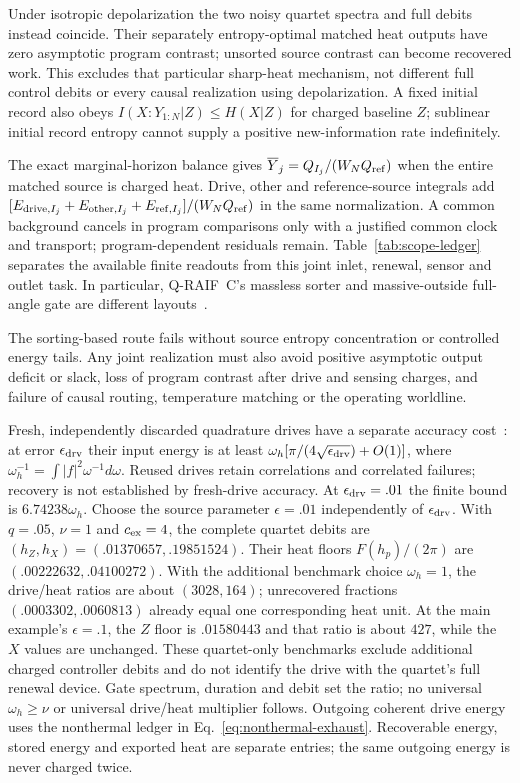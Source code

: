 Under isotropic depolarization the two noisy quartet spectra and full
debits instead coincide. Their separately entropy-optimal matched heat
outputs have zero asymptotic program contrast; unsorted source contrast
can become recovered work. This excludes that particular sharp-heat
mechanism, not different full control debits or every causal realization
using depolarization. A fixed initial record also obeys
$I(X:Y_{1:N}|Z)\le H(X|Z)$ for charged baseline $Z$; sublinear initial
record entropy cannot supply a positive new-information rate indefinitely.

The exact marginal-horizon balance gives
$\overline Y_j=Q_{I_j}/(W_NQ_{\rm ref})$ when the entire matched
source is charged heat. Drive, other and reference-source integrals
add $[E_{{\rm drive},I_j}+E_{{\rm other},I_j}
+E_{{\rm ref},I_j}]/(W_NQ_{\rm ref})$ in the same normalization. A common background cancels in
program comparisons only with a justified common clock and transport;
program-dependent residuals remain. Table~\ref{tab:scope-ledger} separates the available finite readouts
from this joint inlet, renewal, sensor and outlet task. In particular,
Q-RAIF~C's massless sorter and massive-outside full-angle gate are
different layouts~\cite{QRC}.

The sorting-based route fails without source entropy concentration or
controlled energy tails. Any joint realization must also avoid positive
asymptotic output deficit or slack, loss of program contrast after drive
and sensing charges, and failure of causal routing, temperature matching
or the operating worldline.

Fresh, independently discarded quadrature drives have a separate
accuracy cost~\cite{Liu2026QRAIFB}: at error $\epsilon_{\rm drv}$ their
input energy is at least $\omega_h[\pi/(4\sqrt{\epsilon_{\rm drv}})+O(1)]$,
where $\omega_h^{-1}=\int|f|^2\omega^{-1}d\omega$.
Reused drives retain correlations and correlated failures; recovery is
not established by fresh-drive accuracy. At $\epsilon_{\rm drv}=.01$
the finite bound is $6.74238\omega_h$. Choose the source parameter
$\epsilon=.01$ independently of $\epsilon_{\rm drv}$.
With $q=.05$, $\nu=1$ and $c_{\rm ex}=4$, the complete quartet debits are
$(h_Z,h_X)=(.01370657,.19851524)$. Their heat floors
$F(h_p)/(2\pi)$ are $(.00222632,.04100272)$.
With the additional benchmark choice $\omega_h=1$, the drive/heat
ratios are about $(3028,164)$; unrecovered fractions
$(.0003302,.0060813)$ already equal one corresponding heat unit.
At the main example's $\epsilon=.1$, the $Z$ floor is $.01580443$
and that ratio is about $427$, while the $X$ values are unchanged.
These quartet-only benchmarks exclude additional charged controller
debits and do not identify the drive with the quartet's full renewal
device. Gate spectrum, duration and debit set the ratio; no universal
$\omega_h\ge\nu$ or universal drive/heat multiplier follows. Outgoing coherent
drive energy uses the nonthermal ledger in Eq.~\eqref{eq:nonthermal-exhaust}.
Recoverable energy, stored energy and exported heat are separate entries;
the same outgoing energy is never charged twice.

